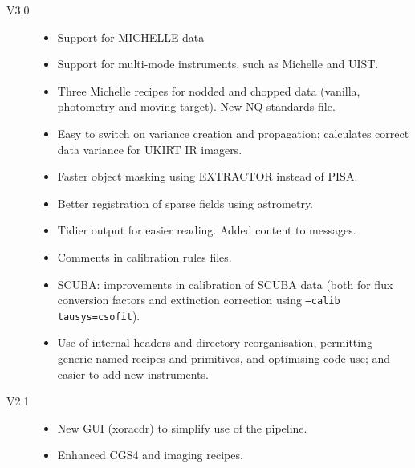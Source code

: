 \documentclass[twoside,11pt]{article}
\renewcommand{\_}{\texttt{\symbol{95}}}
\begin{document}
\begin{description}

\item[V3.0]

\begin{itemize}

\item Support for MICHELLE data

\item Support for multi-mode instruments, such as Michelle and UIST.

\item Three Michelle recipes for nodded and chopped data (vanilla,
  photometry and moving target).  New NQ standards file.

\item Easy to switch on variance creation and propagation; calculates
  correct data variance for UKIRT IR imagers.

\item  Faster object masking using EXTRACTOR instead of PISA.

\item Better registration of sparse fields using astrometry.

\item Tidier output for easier reading.  Added content to messages.

\item Comments in calibration rules files.

\item SCUBA: improvements in calibration of SCUBA data (both for flux
    conversion factors and extinction correction using
     \texttt{--calib tausys=csofit}).

\item Use of internal headers and directory reorganisation, permitting
     generic-named recipes and primitives, and optimising code use;
     and easier to add new instruments.

\end{itemize}

\item[V2.1]

\begin{itemize}

\item New GUI (xoracdr) to simplify use of the pipeline.

\item Enhanced CGS4 and imaging recipes.

\end{itemize}


\end{description}
\end{document}

